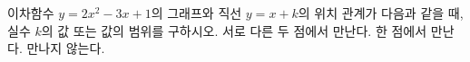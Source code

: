 이차함수 $y=2x^2-3x+1$의 그래프와 직선 $y=x+k$의 위치 관계가 다음과 같을 때, 실수 $k$의 값 또는 값의 범위를 구하시오.
 서로 다른 두 점에서 만난다.
 한 점에서 만난다.
 만나지 않는다.
